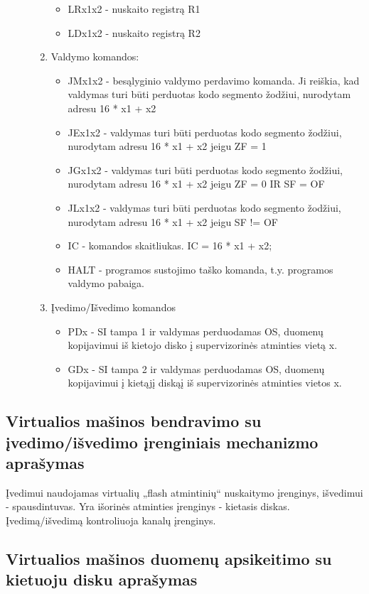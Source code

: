 \begin{description}
\begin{enumerate}
\begin{itemize}
\item LRx1x2 -  nuskaito registrą R1
\item LDx1x2 -  nuskaito registrą R2
\end{itemize}
\item Valdymo komandos:
	\begin{itemize}
		\item JMx1x2 - besąlyginio valdymo perdavimo komanda. Ji reiškia, kad valdymas turi būti perduotas kodo segmento žodžiui, nurodytam adresu 16 * x1 + x2	
		\item JEx1x2 - valdymas turi būti perduotas kodo segmento žodžiui, nurodytam adresu 16 * x1 + x2 jeigu ZF = 1
		\item JGx1x2 - valdymas turi būti perduotas kodo segmento žodžiui, nurodytam adresu 16 * x1 + x2 jeigu ZF = 0 IR SF = OF
		\item JLx1x2 - valdymas turi būti perduotas kodo segmento žodžiui, nurodytam adresu 16 * x1 + x2 jeigu SF != OF
		\item IC - komandos skaitliukas. IC = 16 * x1 + x2;
		\item HALT - programos sustojimo taško komanda, t.y. programos valdymo pabaiga.
	\end{itemize}

\item Įvedimo/Išvedimo komandos
	\begin{itemize}
		\item PDx - SI tampa 1 ir valdymas perduodamas OS, duomenų kopijavimui iš kietojo disko į supervizorinės atminties vietą x.
		\item GDx - SI tampa 2 ir valdymas perduodamas OS, duomenų kopijavimui į kietąjį diskąį iš supervizorinės atminties vietos x. 
	\end{itemize}

\end{enumerate}
\end{description}   
   
\subsection{Virtualios mašinos bendravimo su įvedimo/išvedimo įrenginiais
mechanizmo aprašymas}

Įvedimui naudojamas virtualių „flash atmintinių“ nuskaitymo įrenginys, išvedimui - spausdintuvas. Yra išorinės atminties įrenginys - kietasis diskas. Įvedimą/išvedimą kontroliuoja kanalų įrenginys.

\subsection{Virtualios mašinos duomenų apsikeitimo su kietuoju disku aprašymas}

